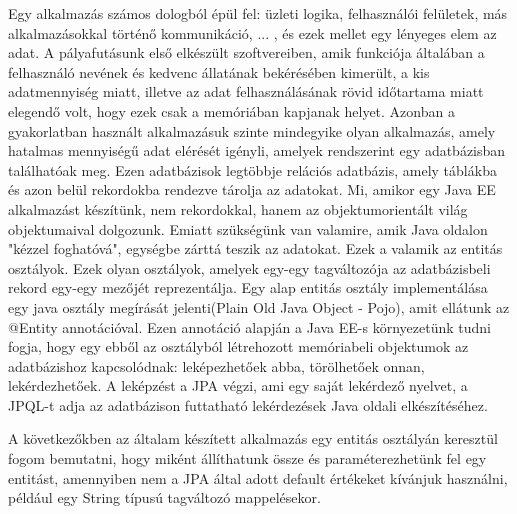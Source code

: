 \documentclass[centeredchapter]{thesis-ekf}
\theoremstyle{definition}
\theoremstyle{remark}
\begin{document}
Egy alkalmazás számos dologból épül fel: üzleti logika, felhasználói felületek, más alkalmazásokkal történő kommunikáció, ... , és ezek mellet egy lényeges elem az adat. A pályafutásunk első elkészült szoftvereiben, amik funkciója általában a felhasználó nevének és kedvenc állatának bekérésében kimerült, a kis adatmennyiség miatt, illetve az adat felhasználásának rövid időtartama miatt elegendő volt, hogy ezek csak a memóriában kapjanak helyet. Azonban a gyakorlatban használt alkalmazásuk szinte mindegyike olyan alkalmazás, amely hatalmas mennyiségű adat elérését igényli, amelyek rendszerint egy adatbázisban találhatóak meg. Ezen adatbázisok legtöbbje relációs adatbázis, amely táblákba és azon belül rekordokba rendezve tárolja az adatokat. Mi, amikor egy Java EE alkalmazást készítünk, nem rekordokkal, hanem az objektumorientált világ objektumaival dolgozunk. Emiatt szükségünk van valamire, amik Java oldalon "kézzel foghatóvá", egységbe zárttá teszik az adatokat. Ezek a valamik az entitás osztályok. Ezek olyan osztályok, amelyek egy-egy tagváltozója az adatbázisbeli rekord egy-egy mezőjét reprezentálja. Egy alap entitás osztály implementálása egy java osztály megírását jelenti(Plain Old Java Object - Pojo), amit ellátunk az @Entity annotációval. Ezen annotáció alapján a Java EE-s környezetünk tudni fogja, hogy egy ebből az osztályból létrehozott memóriabeli objektumok az adatbázishoz kapcsolódnak: leképezhetőek abba, törölhetőek onnan, lekérdezhetőek. A leképzést a JPA végzi, ami egy saját lekérdező nyelvet, a  JPQL-t adja az adatbázison futtatható lekérdezések Java oldali elkészítéséhez.



A következőkben az általam készített alkalmazás egy entitás osztályán keresztül fogom bemutatni, hogy miként állíthatunk össze és paraméterezhetünk fel egy entitást, amennyiben nem a JPA által adott default értékeket kívánjuk használni, például egy String típusú tagváltozó mappelésekor.
\end{document}
